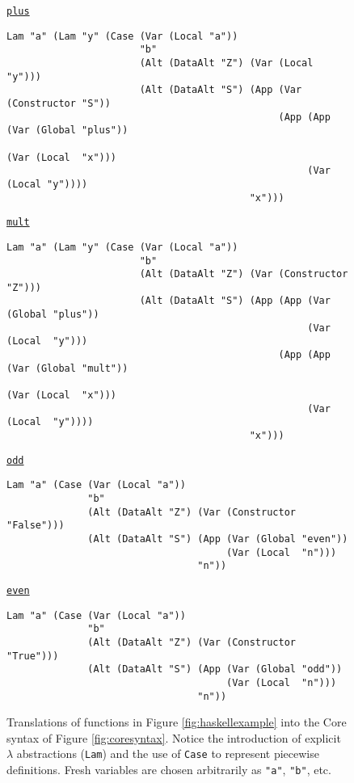 \begin{figure}
  \begin{small}
    \underline{\texttt{plus}}
    \begin{verbatim}
Lam "a" (Lam "y" (Case (Var (Local "a"))
                       "b"
                       (Alt (DataAlt "Z") (Var (Local "y")))
                       (Alt (DataAlt "S") (App (Var (Constructor "S"))
                                               (App (App (Var (Global "plus"))
                                                         (Var (Local  "x")))
                                                    (Var (Local "y"))))
                                          "x")))
    \end{verbatim}

    \underline{\texttt{mult}}
    \begin{verbatim}
Lam "a" (Lam "y" (Case (Var (Local "a"))
                       "b"
                       (Alt (DataAlt "Z") (Var (Constructor "Z")))
                       (Alt (DataAlt "S") (App (App (Var (Global "plus"))
                                                    (Var (Local  "y")))
                                               (App (App (Var (Global "mult"))
                                                         (Var (Local  "x")))
                                                    (Var (Local  "y"))))
                                          "x")))
    \end{verbatim}

    \underline{\texttt{odd}}
    \begin{verbatim}
Lam "a" (Case (Var (Local "a"))
              "b"
              (Alt (DataAlt "Z") (Var (Constructor "False")))
              (Alt (DataAlt "S") (App (Var (Global "even"))
                                      (Var (Local  "n")))
                                 "n"))
    \end{verbatim}

    \underline{\texttt{even}}
    \begin{verbatim}
Lam "a" (Case (Var (Local "a"))
              "b"
              (Alt (DataAlt "Z") (Var (Constructor "True")))
              (Alt (DataAlt "S") (App (Var (Global "odd"))
                                      (Var (Local  "n")))
                                 "n"))
    \end{verbatim}
  \end{small}
  \caption{Translations of functions in Figure \ref{fig:haskellexample} into the Core syntax of Figure \ref{fig:coresyntax}. Notice the introduction of explicit $\lambda$ abstractions (\texttt{Lam}) and the use of \texttt{Case} to represent piecewise definitions. Fresh variables are chosen arbitrarily as \texttt{"a"}, \texttt{"b"}, etc.}
  \label{fig:coreexample}
\end{figure}

